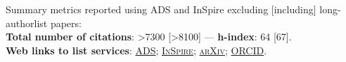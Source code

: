 Summary metrics reported using ADS and InSpire excluding [including] long-authorlist papers:
\\
\textcolor{mark_color}{\textbf{Total number of citations}}: >7300 [>8100]
 --- 
\textcolor{mark_color}{\textbf{h-index}}: 64 [67].
\\
\textcolor{mark_color}{\textbf{Web links to list services}}:
\href{https://davidegerosa.com/myads}{\textsc{ADS}};
\href{https://davidegerosa.com/myinspire}{\textsc{InSpire}};
\href{http://davidegerosa.com/myarxiv}{\textsc{arXiv}};
\href{https://davidegerosa.com/myorcid}{\textsc{ORCID}}.